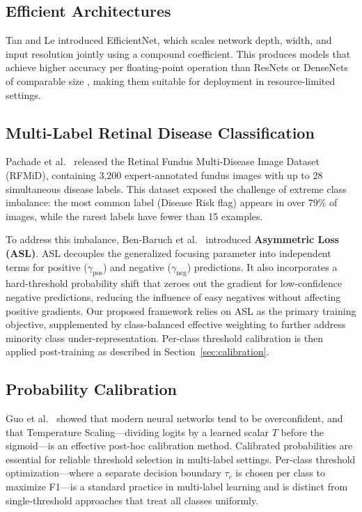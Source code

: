 \documentclass[conference]{IEEEtran}
\begin{document}
\subsection{Efficient Architectures}
Tan and Le \cite{tan2019efficientnet} introduced EfficientNet, which scales network depth, width, and input resolution jointly using a compound coefficient. This produces models that achieve higher accuracy per floating-point operation than ResNets or DenseNets of comparable size \cite{huang2017densely}, making them suitable for deployment in resource-limited settings.

\subsection{Multi-Label Retinal Disease Classification}
Pachade et al.\ \cite{pachade2021retinal} released the Retinal Fundus Multi-Disease Image Dataset (RFMiD), containing 3,200 expert-annotated fundus images with up to 28 simultaneous disease labels. This dataset exposed the challenge of extreme class imbalance: the most common label (Disease Risk flag) appears in over 79\% of images, while the rarest labels have fewer than 15 examples.

To address this imbalance, Ben-Baruch et al.\ \cite{ben2020asymmetric} introduced \textbf{Asymmetric Loss (ASL)}. ASL decouples the generalized focusing parameter into independent terms for positive ($\gamma_{\text{pos}}$) and negative ($\gamma_{\text{neg}}$) predictions. It also incorporates a hard-threshold probability shift that zeroes out the gradient for low-confidence negative predictions, reducing the influence of easy negatives without affecting positive gradients. Our proposed framework relies on ASL as the primary training objective, supplemented by class-balanced effective weighting to further address minority class under-representation. Per-class threshold calibration is then applied post-training as described in Section~\ref{sec:calibration}.

\subsection{Probability Calibration}
Guo et al.\ \cite{guo2017calibration} showed that modern neural networks tend to be overconfident, and that Temperature Scaling—dividing logits by a learned scalar $T$ before the sigmoid—is an effective post-hoc calibration method. Calibrated probabilities are essential for reliable threshold selection in multi-label settings. Per-class threshold optimization—where a separate decision boundary $\tau_c$ is chosen per class to maximize F1—is a standard practice in multi-label learning \cite{read2011classifier} and is distinct from single-threshold approaches that treat all classes uniformly.
\end{document}
